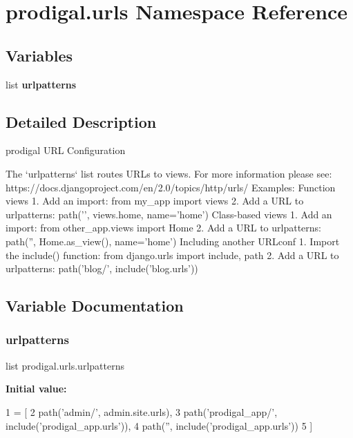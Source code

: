 \hypertarget{namespaceprodigal_1_1urls}{}\section{prodigal.\+urls Namespace Reference}
\label{namespaceprodigal_1_1urls}
\subsection*{Variables}
\begin{DoxyCompactItemize}
\item 
list {\bfseries urlpatterns}
\end{DoxyCompactItemize}


\subsection{Detailed Description}
\begin{DoxyVerb}prodigal URL Configuration

The `urlpatterns` list routes URLs to views. For more information please see:
https://docs.djangoproject.com/en/2.0/topics/http/urls/
Examples:
Function views
1. Add an import:  from my_app import views
2. Add a URL to urlpatterns:  path('', views.home, name='home')
Class-based views
1. Add an import:  from other_app.views import Home
2. Add a URL to urlpatterns:  path('', Home.as_view(), name='home')
Including another URLconf
1. Import the include() function: from django.urls import include, path
2. Add a URL to urlpatterns:  path('blog/', include('blog.urls'))
\end{DoxyVerb}
 

\subsection{Variable Documentation}
\mbox{\label{namespaceprodigal_1_1urls_aa2043924c15d83983ce0a4ee64c14321}} 
\subsubsection{\texorpdfstring{urlpatterns}{urlpatterns}}
{\footnotesize\ttfamily list prodigal.\+urls.\+urlpatterns}

{\bfseries Initial value\+:}
\begin{DoxyCode}
1 =  [
2     path(\textcolor{stringliteral}{'admin/'}, admin.site.urls),
3     path(\textcolor{stringliteral}{'prodigal\_app/'}, include(\textcolor{stringliteral}{'prodigal\_app.urls'})),
4     path(\textcolor{stringliteral}{''}, include(\textcolor{stringliteral}{'prodigal\_app.urls'}))
5 ]
\end{DoxyCode}

